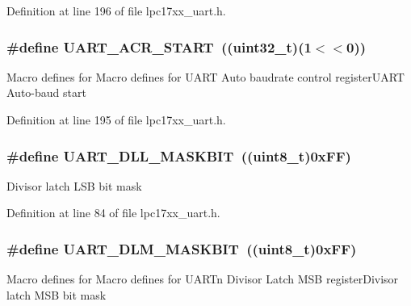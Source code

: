 Definition at line 196 of file lpc17xx\+\_\+uart.\+h.

\subsubsection[{\texorpdfstring{U\+A\+R\+T\+\_\+\+A\+C\+R\+\_\+\+S\+T\+A\+RT}{UART_ACR_START}}]{\setlength{\rightskip}{0pt plus 5cm}\#define U\+A\+R\+T\+\_\+\+A\+C\+R\+\_\+\+S\+T\+A\+RT~(({\bf uint32\+\_\+t})(1$<$$<$0))}\hypertarget{group___u_a_r_t___private___macros_gaf6a6a4cb65edff2871ba48d3f2b445dc}{}\label{group___u_a_r_t___private___macros_gaf6a6a4cb65edff2871ba48d3f2b445dc}
Macro defines for Macro defines for U\+A\+RT Auto baudrate control register\+U\+A\+RT Auto-\/baud start 

Definition at line 195 of file lpc17xx\+\_\+uart.\+h.

\subsubsection[{\texorpdfstring{U\+A\+R\+T\+\_\+\+D\+L\+L\+\_\+\+M\+A\+S\+K\+B\+IT}{UART_DLL_MASKBIT}}]{\setlength{\rightskip}{0pt plus 5cm}\#define U\+A\+R\+T\+\_\+\+D\+L\+L\+\_\+\+M\+A\+S\+K\+B\+IT~(({\bf uint8\+\_\+t})0x\+F\+F)}\hypertarget{group___u_a_r_t___private___macros_ga85050a24048ffc2de997cd60ea67f9df}{}\label{group___u_a_r_t___private___macros_ga85050a24048ffc2de997cd60ea67f9df}
Divisor latch L\+SB bit mask 

Definition at line 84 of file lpc17xx\+\_\+uart.\+h.

\subsubsection[{\texorpdfstring{U\+A\+R\+T\+\_\+\+D\+L\+M\+\_\+\+M\+A\+S\+K\+B\+IT}{UART_DLM_MASKBIT}}]{\setlength{\rightskip}{0pt plus 5cm}\#define U\+A\+R\+T\+\_\+\+D\+L\+M\+\_\+\+M\+A\+S\+K\+B\+IT~(({\bf uint8\+\_\+t})0x\+F\+F)}\hypertarget{group___u_a_r_t___private___macros_gaf4d480e07f82896893e45b572adeffcd}{}\label{group___u_a_r_t___private___macros_gaf4d480e07f82896893e45b572adeffcd}
Macro defines for Macro defines for U\+A\+R\+Tn Divisor Latch M\+SB register\+Divisor latch M\+SB bit mask 

